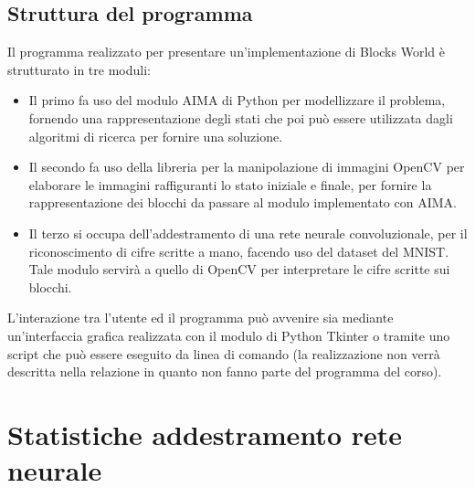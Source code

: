 \documentclass{article}
\begin{document}
	\subsection{Struttura del programma}
	Il programma realizzato per presentare un'implementazione di Blocks World è strutturato in tre moduli:
	\begin{itemize}
		\item Il primo fa uso del modulo AIMA di Python per modellizzare il problema, fornendo una rappresentazione degli stati che poi può essere utilizzata dagli algoritmi di ricerca per fornire una soluzione.
		\item Il secondo fa uso della libreria per la manipolazione di immagini OpenCV per elaborare le immagini raffiguranti lo stato iniziale e finale, per fornire la rappresentazione dei blocchi da passare al modulo implementato con AIMA.
		\item Il terzo si occupa dell'addestramento di una rete neurale convoluzionale, per il riconoscimento di cifre scritte a mano, facendo uso del dataset del MNIST. Tale modulo servirà a quello di OpenCV per interpretare le cifre scritte sui blocchi.
	\end{itemize}
	L'interazione tra l'utente ed il programma può avvenire sia mediante un'interfaccia grafica realizzata con il modulo di Python Tkinter o tramite uno script che può essere eseguito da linea di comando (la realizzazione non verrà descritta nella relazione in quanto non fanno parte del programma del corso).

	\section{Statistiche addestramento rete neurale}
	
	
\end{document}
